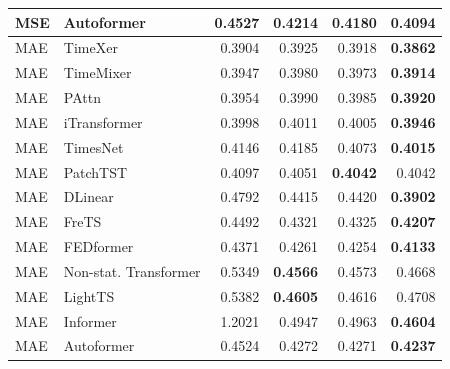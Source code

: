 \begin{longtable}{llrrrr}
MSE & Autoformer & 0.4527 & 0.4214 & 0.4180 & \textbf{0.4094} \\
\midrule
MAE & TimeXer & 0.3904 & 0.3925 & 0.3918 & \textbf{0.3862} \\
MAE & TimeMixer & 0.3947 & 0.3980 & 0.3973 & \textbf{0.3914} \\
MAE & PAttn & 0.3954 & 0.3990 & 0.3985 & \textbf{0.3920} \\
MAE & iTransformer & 0.3998 & 0.4011 & 0.4005 & \textbf{0.3946} \\
MAE & TimesNet & 0.4146 & 0.4185 & 0.4073 & \textbf{0.4015} \\
MAE & PatchTST & 0.4097 & 0.4051 & \textbf{0.4042} & 0.4042 \\
MAE & DLinear & 0.4792 & 0.4415 & 0.4420 & \textbf{0.3902} \\
MAE & FreTS & 0.4492 & 0.4321 & 0.4325 & \textbf{0.4207} \\
MAE & FEDformer & 0.4371 & 0.4261 & 0.4254 & \textbf{0.4133} \\
MAE & Non-stat. Transformer & 0.5349 & \textbf{0.4566} & 0.4573 & 0.4668 \\
MAE & LightTS & 0.5382 & \textbf{0.4605} & 0.4616 & 0.4708 \\
MAE & Informer & 1.2021 & 0.4947 & 0.4963 & \textbf{0.4604} \\
MAE & Autoformer & 0.4524 & 0.4272 & 0.4271 & \textbf{0.4237} \\
\end{longtable}
\endgroup

